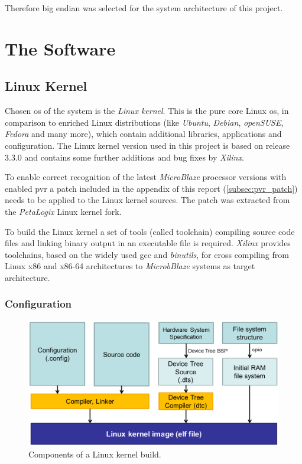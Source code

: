 Therefore big endian was selected for the system architecture of this project.

\section{The Software}

\subsection{Linux Kernel}

Chosen \gls{os} of the system is the \textit{Linux kernel}. This is the pure core Linux \gls{os}, in comparison to enriched Linux distributions (like \textit{Ubuntu}, \textit{Debian}, \textit{openSUSE}, \textit{Fedora} and many more), which contain additional libraries, applications and configuration. The Linux kernel version used in this project is based on release 3.3.0 and contains some further additions and bug fixes by \textit{Xilinx}.

To enable correct recognition of the latest \textit{MicroBlaze} processor versions with enabled \gls{pvr} a patch included in the appendix of this report (\ref{subsec:pvr_patch}) needs to be applied to the Linux kernel sources. The patch was extracted from the \textit{PetaLogix} Linux kernel fork.

To build the Linux kernel a set of tools (called toolchain) compiling source code files and linking binary output in an executable file is required. \textit{Xilinx} provides toolchains, based on the widely used \gls{gcc} and \textit{binutils}, for cross compiling from Linux x86 and x86-64 architectures to \textit{MicrobBlaze} systems as target architecture.

\subsubsection{Configuration}

\begin{figure}
	\centering
	\includegraphics[width=.6\textwidth]{linux-config-build.png}
	\caption{Components of a Linux kernel build.}
\end{figure}

